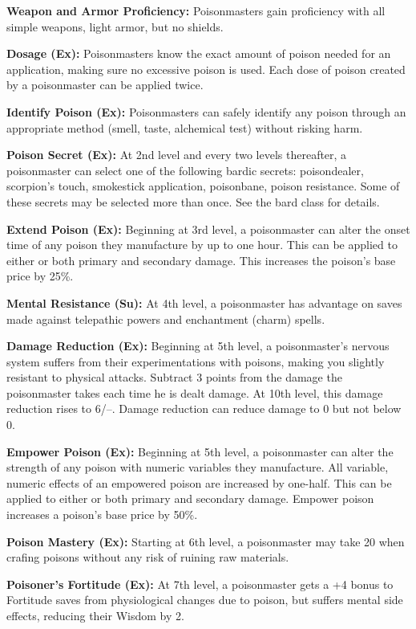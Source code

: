 {
\textbf{Weapon and Armor Proficiency:} Poisonmasters gain proficiency with all simple weapons, light armor, but no shields.

\textbf{Dosage (Ex):} Poisonmasters know the exact amount of poison needed for an application, making sure no excessive poison is used. Each dose of poison created by a poisonmaster can be applied twice.

\textbf{Identify Poison (Ex):} Poisonmasters can safely identify any poison through an appropriate method (smell, taste, alchemical test) without risking harm.

\textbf{Poison Secret (Ex):} At 2nd level and every two levels thereafter, a poisonmaster can select one of the following bardic secrets: poisondealer, scorpion's touch, smokestick application, poisonbane, poison resistance. Some of these secrets may be selected more than once. See the bard class for details.

\textbf{Extend Poison (Ex):} Beginning at 3rd level, a poisonmaster can alter the onset time of any poison they manufacture by up to one hour. This can be applied to either or both primary and secondary damage. This increases the poison's base price by 25\%.

\textbf{Mental Resistance (Su):} At 4th level, a poisonmaster has advantage on saves made against telepathic powers and enchantment (charm) spells.

\textbf{Damage Reduction (Ex):} Beginning at 5th level, a poisonmaster's nervous system suffers from their experimentations with poisons, making you slightly resistant to physical attacks. Subtract 3 points from the damage the poisonmaster takes each time he is dealt damage. At 10th level, this damage reduction rises to 6/--. Damage reduction can reduce damage to 0 but not below 0.

\textbf{Empower Poison (Ex):} Beginning at 5th level, a poisonmaster can alter the strength of any poison with numeric variables they manufacture. All variable, numeric effects of an empowered poison are increased by one-half. This can be applied to either or both primary and secondary damage. Empower poison increases a poison's base price by 50\%.

\textbf{Poison Mastery (Ex):} Starting at 6th level, a poisonmaster may take 20 when crafing poisons without any risk of ruining raw materials.

\textbf{Poisoner's Fortitude (Ex):} At 7th level, a poisonmaster gets a +4 bonus to Fortitude saves from physiological changes due to poison, but suffers mental side effects, reducing their Wisdom by 2.

}
